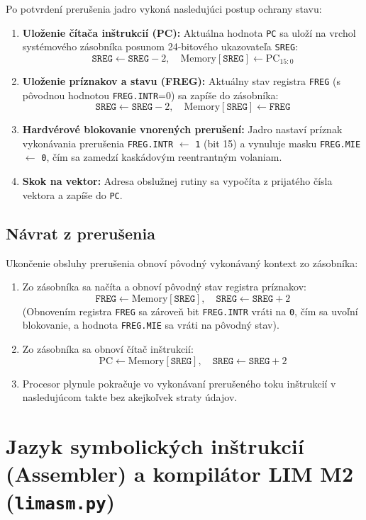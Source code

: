 \documentclass[11pt,a4paper]{article}
\newcommand{\reg}[1]{\texttt{#1}}
\begin{document}
Po potvrdení prerušenia jadro vykoná nasledujúci postup ochrany stavu:
\begin{enumerate}
  \item \textbf{Uloženie čítača inštrukcií (PC):} Aktuálna hodnota \texttt{PC} sa uloží na vrchol systémového zásobníka posunom 24-bitového ukazovateľa \reg{SREG}:
  $$\reg{SREG} \leftarrow \reg{SREG} - 2, \quad \text{Memory}[\reg{SREG}] \leftarrow \text{PC}_{15:0}$$
  \item \textbf{Uloženie príznakov a stavu (FREG):} Aktuálny stav registra \reg{FREG} (s pôvodnou hodnotou \reg{FREG.INTR}=0) sa zapíše do zásobníka:
  $$\reg{SREG} \leftarrow \reg{SREG} - 2, \quad \text{Memory}[\reg{SREG}] \leftarrow \reg{FREG}$$
  \item \textbf{Hardvérové blokovanie vnorených prerušení:} Jadro nastaví príznak vykonávania prerušenia \reg{FREG.INTR} $\leftarrow$ \texttt{1} (bit 15) a vynuluje masku \reg{FREG.MIE} $\leftarrow$ \texttt{0}, čím sa zamedzí kaskádovým reentrantným volaniam.
  \item \textbf{Skok na vektor:} Adresa obslužnej rutiny sa vypočíta z prijatého čísla vektora a zapíše do \texttt{PC}.
\end{enumerate}

\subsection{Návrat z prerušenia}
Ukončenie obsluhy prerušenia obnoví pôvodný vykonávaný kontext zo zásobníka:
\begin{enumerate}
  \item Zo zásobníka sa načíta a obnoví pôvodný stav registra príznakov:
  $$\reg{FREG} \leftarrow \text{Memory}[\reg{SREG}], \quad \reg{SREG} \leftarrow \reg{SREG} + 2$$
  (Obnovením registra \reg{FREG} sa zároveň bit \reg{FREG.INTR} vráti na \texttt{0}, čím sa uvoľní blokovanie, a hodnota \reg{FREG.MIE} sa vráti na pôvodný stav).
  \item Zo zásobníka sa obnoví čítač inštrukcií:
  $$\text{PC} \leftarrow \text{Memory}[\reg{SREG}], \quad \reg{SREG} \leftarrow \reg{SREG} + 2$$
  \item Procesor plynule pokračuje vo vykonávaní prerušeného toku inštrukcií v nasledujúcom takte bez akejkoľvek straty údajov.
\end{enumerate}

\clearpage
\section{Jazyk symbolických inštrukcií (Assembler) a kompilátor LIM M2 (\texttt{limasm.py})}
\end{document}
